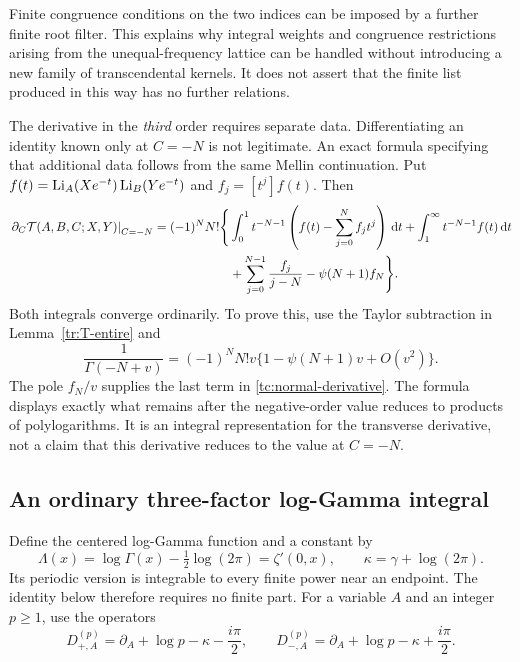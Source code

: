 Finite congruence conditions on the two indices can be imposed by a
further finite root filter. This explains why integral weights and
congruence restrictions arising from the unequal-frequency lattice can
be handled without introducing a new family of transcendental kernels.
It does not assert that the finite list produced in this way has no
further relations.

The derivative in the \emph{third} order requires separate data.
Differentiating an identity known only at $C=-N$ is not legitimate.
An exact formula specifying that additional data follows from the
same Mellin continuation. Put
$f(t)=\operatorname{Li}_A(Xe^{-t})\operatorname{Li}_B(Ye^{-t})$ and $f_j=[t^j]f(t)$. Then
\begin{align}\label{tc:normal-derivative}
 \left.\partial_C\mathcal T(A,B,C;X,Y)\right|_{C=-N}
 =(-1)^NN!\Bigg\{&
  \int_0^1t^{-N-1}\left(f(t)-\sum_{j=0}^Nf_jt^j\right)\,\mathrm d t
  +\int_1^\infty t^{-N-1}f(t)\,\mathrm d t\notag\\
 &+\sum_{j=0}^{N-1}\frac{f_j}{j-N}
        -\psi(N+1)f_N\Bigg\}.
\end{align}
Both integrals converge ordinarily. To prove this, use the Taylor
subtraction in Lemma~\ref{tr:T-entire} and
\[
 \frac1{\Gamma(-N+v)}
   =(-1)^NN!v\{1-\psi(N+1)v+O(v^2)\}.
\]
The pole $f_N/v$ supplies the last term in
\eqref{tc:normal-derivative}. The formula displays exactly what remains
after the negative-order value reduces to products of polylogarithms.
It is an integral representation for the transverse derivative, not a
claim that this derivative reduces to the value at $C=-N$.

\subsection{An ordinary three-factor log-Gamma integral}
Define the centered log-Gamma function and a constant by
\begin{equation}\label{tc:centered-Gamma}
 \Lambda(x)=\log\Gamma(x)-\tfrac12\log(2\pi)=\zeta'(0,x),
 \qquad \kappa=\gamma+\log(2\pi).
\end{equation}
Its periodic version is integrable to every finite power near an
endpoint. The identity below therefore requires no finite part.
For a variable $A$ and an integer $p\geq1$, use the operators
\begin{equation}\label{tc:Doperators}
 D_{+,A}^{(p)}=\partial_A+\log p-\kappa-\frac{i\pi}{2},
 \qquad
 D_{-,A}^{(p)}=\partial_A+\log p-\kappa+\frac{i\pi}{2}.
\end{equation}

